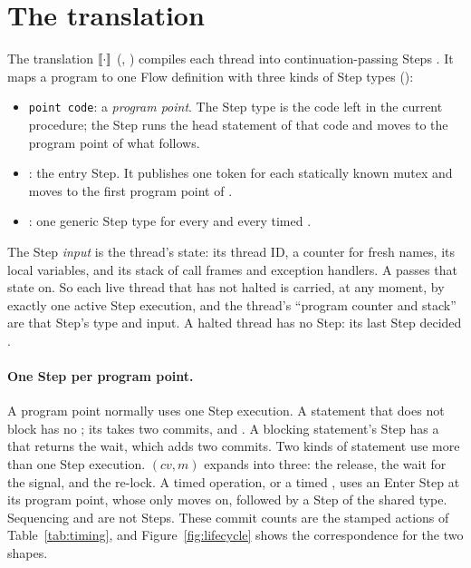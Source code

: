 \section{The translation}
\label{sec:translation}

The translation $\llbracket \cdot \rrbracket$ (,
) compiles each \Lang{} thread into
continuation-passing Steps \cite{appel1992cps}. It maps a program to one
Flow definition with three kinds of Step types ():
\begin{itemize}
\item \texttt{point code}: a \emph{program point}. The Step type is the code
  left in the current procedure; the Step runs the head statement of that
  code and moves to the program point of what follows.
\item {}: the entry Step. It publishes one token for each
  statically known mutex and moves to the first program point of .
\item {}: one generic Step type for every  and every
  timed .
\end{itemize}
The Step \emph{input} is the thread's state: its thread ID, a counter for
fresh names, its local variables, and its stack of call frames and
exception handlers. A  passes that state on. So each live thread
that has not halted is carried, at any moment, by exactly one active Step
execution, and the thread's ``program counter and stack'' are that Step's
type and input. A halted thread has no Step: its last Step decided
.

\paragraph{One Step per program point.}
A program point normally uses one Step execution. A statement that does
not block has no ; its  takes two commits,
 and . A blocking
statement's Step has a  that returns the wait, which adds two
commits. Two kinds of statement use more than one Step execution.
$(\mathit{cv}, m)$ expands into three: the release, the wait for
the signal, and the re-lock. A timed operation,  or a timed
, uses an Enter Step at its program point, whose 
only moves on, followed by a Step of the shared  type.
Sequencing and  are not Steps. These commit counts are the
stamped actions of
Table~\ref{tab:timing}, and Figure~\ref{fig:lifecycle} shows the
correspondence for the two shapes.

